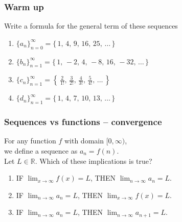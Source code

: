 \documentclass[14pt]{beamer}
\begin{document}
\begin{frame}[t]
	\frametitle{Warm up}

	Write a formula for the general term of these sequences
	\vfill
	\begin{enumerate}
		\item $\displaystyle \{a_{n}\}_{n=0}^{\infty}= \{ \, 1, \, 4, \, 9, \, 16, \,
			25, \, \ldots \, \}$
			\vfill

		\item $\displaystyle \{b_{n}\}_{n=1}^{\infty}= \{ \, 1, \, -2, \, 4, \, -8, \,
			16, \, -32, \, \ldots \, \}$
			\vfill

		\item $\displaystyle \{c_{n}\}_{n=1}^{\infty}= \left\{ \, \frac{2}{1!}, \, \frac{3}{2!}
			, \, \frac{4}{3!}, \, \frac{5}{4!}, \, \ldots \, \right\}$
			\vfill

		\item $\displaystyle \{d_{n}\}_{n=1}^{\infty}= \{ \, 1, \, 4, \, 7, \, 10, \,
			13, \, \ldots \, \}$
	\end{enumerate}
\end{frame}

\begin{frame}[t]
	\frametitle{Sequences vs functions -- convergence}

	For any function $f$ with domain $[0, \infty)$, \\ we define a sequence as $a_{n}
	= f(n)$. \\ Let $L \in \mathbb{R}$. Which of these implications is true?

	\begin{enumerate}
		\item IF $\displaystyle \lim_{x \to \infty}f(x) = L$, \; THEN
			$\displaystyle \lim_{n \to \infty}a_{n}= L$.
			\vfill

		\item IF $\displaystyle \lim_{n \to \infty}a_{n}= L$, \; THEN
			$\displaystyle \lim_{x \to \infty}f(x) = L$.
			\vfill

		\item IF $\displaystyle \lim_{n \to \infty}a_{n}= L$, \; THEN
			$\displaystyle \lim_{n \to \infty}a_{n+1}= L$.
	\end{enumerate}
\end{frame}
\end{document}
